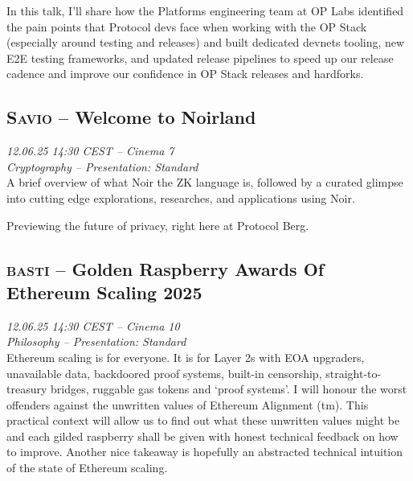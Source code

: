 In this talk, I’ll share how the Platforms engineering team at OP Labs identified the pain points that Protocol devs face when working with the OP Stack (especially around testing and releases) and built dedicated devnets tooling, new E2E testing frameworks, and updated release pipelines to speed up our release cadence and improve our confidence in OP Stack releases and hardforks.

\clearpage
\subsection {\textsc{Savio}  -- Welcome to Noirland} \noindent \textit {12.06.25 14:30 CEST -- Cinema 7\\ Cryptography -- Presentation: Standard}\\[1em] A brief overview of what Noir the ZK language is, followed by a curated glimpse into cutting edge explorations, researches, and applications using Noir.

Previewing the future of privacy, right here at Protocol Berg.

\clearpage
\subsection {\textsc{basti}  -- Golden Raspberry Awards Of Ethereum Scaling 2025} \noindent \textit {12.06.25 14:30 CEST -- Cinema 10\\ Philosophy -- Presentation: Standard}\\[1em] Ethereum scaling is for everyone. It is for Layer 2s with EOA upgraders, unavailable data, backdoored proof systems, built-in censorship, straight-to-treasury bridges, ruggable gas tokens and `proof systems'. I will honour the worst offenders against the unwritten values of Ethereum Alignment (tm). This practical context will allow us to find out what these unwritten values might be and each gilded raspberry shall be given with honest technical feedback on how to improve. Another nice takeaway is hopefully an abstracted technical intuition of the state of Ethereum scaling.

\clearpage
